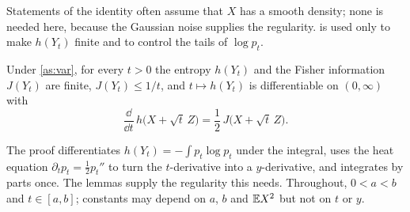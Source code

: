 \documentclass{saim-blog}
\begin{document}
Statements of the identity often assume that $X$ has a smooth density; none is needed here, because the Gaussian noise supplies the regularity.  is used only to make $h(Y_t)$ finite and to control the tails of $\log p_t$.

\SecResult

\begin{mainresult}
\begin{theorem}\label{thm:main}
Under \cref{as:var}, for every $t>0$ the entropy $h(Y_t)$ and the Fisher information $J(Y_t)$ are finite, $J(Y_t)\le 1/t$, and $t\mapsto h(Y_t)$ is differentiable on $(0,\infty)$ with
\begin{equation}\label{eq:main}
\frac{\dd}{\dd t}\,h\big(X+\sqrt t\,Z\big)=\frac12\,J\big(X+\sqrt t\,Z\big).
\end{equation}
\end{theorem}
\end{mainresult}


\SecProof

The proof differentiates $h(Y_t)=-\int p_t\log p_t$ under the integral, uses the heat equation $\partial_tp_t=\tfrac12p_t''$ to turn the $t$-derivative into a $y$-derivative, and integrates by parts once. The lemmas supply the regularity this needs. Throughout, $0<a<b$ and $t\in[a,b]$; constants may depend on $a$, $b$ and $\mathbb{E} X^2$ but not on $t$ or $y$.
\end{document}

